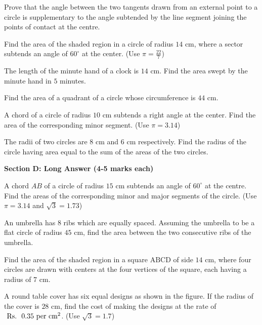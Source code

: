 \documentclass[12pt,a4paper]{exam}
\begin{document}
\begin{questions}
\question[3] Prove that the angle between the two tangents drawn from an external point to a circle is supplementary to the angle subtended by the line segment joining the points of contact at the centre.
\vspace{0.15cm}

\question[3] Find the area of the shaded region in a circle of radius $14$ cm, where a sector subtends an angle of $60^{\circ}$ at the center. (Use $\pi = \frac{22}{7}$)
\vspace{0.15cm}

\question[3] The length of the minute hand of a clock is $14$ cm. Find the area swept by the minute hand in $5$ minutes.
\vspace{0.15cm}

\question[3] Find the area of a quadrant of a circle whose circumference is $44$ cm.
\vspace{0.15cm}

\question[3] A chord of a circle of radius $10$ cm subtends a right angle at the center. Find the area of the corresponding minor segment. (Use $\pi = 3.14$)
\vspace{0.15cm}

\question[3] The radii of two circles are $8$ cm and $6$ cm respectively. Find the radius of the circle having area equal to the sum of the areas of the two circles.
\vspace{0.15cm}

\end{questions}
\bigskip
\noindent\textbf{\large Section D: Long Answer (4-5 marks each)}

\begin{questions}
\question[5] A chord $AB$ of a circle of radius $15 \text{ cm}$ subtends an angle of $60^\circ$ at the centre. Find the areas of the corresponding minor and major segments of the circle. (Use $\pi = 3.14$ and $\sqrt{3} = 1.73$)
\vspace{0.15cm}

\question[5] An umbrella has 8 ribs which are equally spaced. Assuming the umbrella to be a flat circle of radius $45 \text{ cm}$, find the area between the two consecutive ribs of the umbrella.
\vspace{0.15cm}

\question[5] Find the area of the shaded region in a square $\text{ABCD}$ of side $14 \text{ cm}$, where four circles are drawn with centers at the four vertices of the square, each having a radius of $7 \text{ cm}$.
\vspace{0.15cm}

\question[5] A round table cover has six equal designs as shown in the figure. If the radius of the cover is $28 \text{ cm}$, find the cost of making the designs at the rate of $\text{ \text{Rs.~} } 0.35 \text{ per cm}^2$. (Use $\sqrt{3} = 1.7$)
\vspace{0.15cm}

\end{questions}
\bigskip
\end{document}
